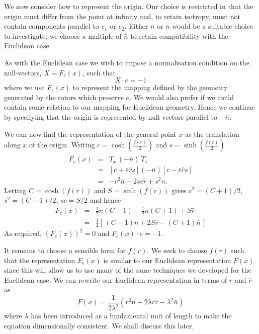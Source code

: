 We now consider how to represent the origin. Our choice is restricted in 
that the origin must differ from the 
point at infinity and, to retain isotropy, must not contain components
parallel to $e_1$ or $e_2$.  Either $n$ or $\bar{n}$ would be a suitable
choice to investigate; we choose a multiple of $\bar{n}$ to retain
compatibility with the Euclidean case.

As with the Euclidean case we wish to impose a normalisation condition 
on the null-vectors, 
$X = F_e(x)$, such that 
\begin{equation}
X \cdot e = -1
\end{equation}
where we use $F_e(x)$ to represent the mapping defined by the geometry
generated by the rotors which
preserve $e$. We would also prefer if we could contain some 
relation to our mapping for Euclidean geometry. Hence we continue by
specifying that the origin is represented by null-vectors parallel to $-\bar{n}$.

We can now find the representation of the general point $x$ as the translation
along $x$ of the origin. Writing $c = \cosh\left(\frac{f(r)}{2}\right)$ and
$s = \sinh\left(\frac{f(r)}{2}\right)$
\begin{eqnarray}
F_e(x) & = & T_x\,(-\bar{n})\,\tilde{T}_x \\
& = & \left[c + \bar{e}\hat{r}s\right] (-\bar{n}) \left[c - \bar{e}\hat{r}s\right] \\
&=& -c^2\bar{n} + 2sc\hat{r} + s^2n.
\end{eqnarray}
Letting $C = \cosh(f(r))$ and $S = \sinh(f(r))$ gives $c^2 = (C+1) / 2$,
$s^2 = (C-1)/2$, $sc = S/2$ and hence
\begin{eqnarray}
F_e(x) & = & \frac{1}{2}n (C-1) - \frac{1}{2}\bar{n}(C+1) + S\hat{r} \nonumber \\
& = & \frac{1}{2} \left[ \, (C-1)n + 2S\hat{r} - (C+1)\bar{n} \, \right] 
\label{eqn:almost-X-rep} 
\end{eqnarray}
As required, $(F_e(x))^2 = 0$ and $F_e(x) \cdot e = -1$.

It remains to choose a sensible form for $f(r)$. We seek to choose $f(r)$ such that
the representation $F_e(x)$ is similar to our Euclidean representation $F(x)$
since this will allow us to use many of the same techniques we developed for the
Euclidean case. We can rewrite our Euclidean representation 
in terms of $r$ and $\hat{r}$ as
\begin{equation}
F(x) = \frac{1}{2\lambda^2}(r^2n + 2 \lambda r\hat{r} - \lambda^2\bar{n})
\label{eqn:nonEuclidMap1}
\end{equation}
where $\lambda$ has been introduced as a fundamental unit of length to make the
equation dimensionally consistent. We shall discuss this later.

